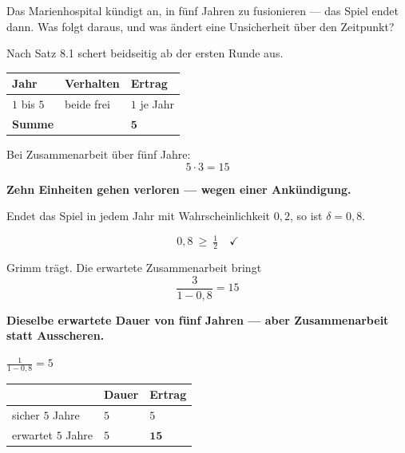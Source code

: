 \begin{aufgabe}
Das Marienhospital kündigt an, in fünf Jahren zu fusionieren --- das Spiel endet dann. Was folgt daraus, und was ändert eine Unsicherheit über den Zeitpunkt?

\loesung
{}
Nach Satz 8.1 schert beidseitig ab der ersten Runde aus.

\begin{center}
\renewcommand{\arraystretch}{1.48}
\begin{tabular}{@{}P{2.4cm}P{2.4cm}P{2.4cm}@{}}
\toprule
\textbf{Jahr} & \textbf{Verhalten} & \textbf{Ertrag}\\
\midrule
$1$ bis $5$ & beide frei & $1$ je Jahr\\
\midrule
\textbf{Summe} & & $\mathbf{5}$\\
\bottomrule
\end{tabular}
\end{center}

Bei Zusammenarbeit über fünf Jahre:
\[ 5\cdot3 = 15 \]

\begin{center}
\begin{minipage}{0.9\textwidth}
\textbf{Zehn Einheiten gehen verloren --- wegen einer Ankündigung.}
\end{minipage}
\end{center}

Endet das Spiel in jedem Jahr mit Wahrscheinlichkeit $0{,}2$, so ist $\delta = 0{,}8$.

\[ 0{,}8 \ \ge\ \tfrac12 \quad \checkmark \]

Grimm trägt. Die erwartete Zusammenarbeit bringt
\[ \frac{3}{1-0{,}8} = 15 \]

\begin{center}
\begin{minipage}{0.9\textwidth}
\textbf{Dieselbe erwartete Dauer von fünf Jahren --- aber Zusammenarbeit statt Ausscheren.}
\end{minipage}
\end{center}

 $\frac{1}{1-0{,}8} = 5$ \checkmark

\begin{center}
{\small
\renewcommand{\arraystretch}{1.5}
\begin{tabular}{@{}P{2.6cm}P{2.0cm}P{2.6cm}@{}}
\toprule
& \textbf{Dauer} & \textbf{Ertrag}\\
\midrule
sicher $5$ Jahre & $5$ & $5$\\
erwartet $5$ Jahre & $5$ & $\mathbf{15}$\\
\bottomrule
\end{tabular}}
\end{center}


\end{aufgabe}

